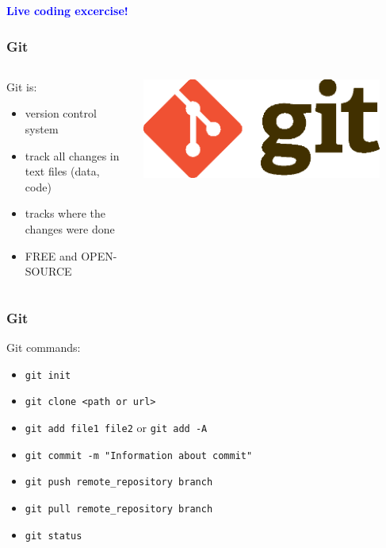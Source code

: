 \documentclass[xcolor=dvipsnames,xcolor=table, 14p]{beamer}
\newcommand{\code}[1]{\colorbox{codegray}{\texttt{#1}}}
\begin{document}
\begin{frame}{}
    \begin{center}
        \textcolor{blue}{\LARGE \bf Live coding excercise!}
    \end{center}
\end{frame}


\begin{frame}\frametitle{Git}
\begin{columns}
    \begin{column}{0.45\textwidth}
        Git is:
        \begin{itemize}
            \item version control system
            \item track all changes in text files (data, code)
            \item tracks where the changes were done
            \item FREE and OPEN-SOURCE
        \end{itemize}
    \end{column}
    \begin{column}{0.45\textwidth}
        \centering
        \includegraphics[width=0.9\textwidth]{../assets/git_logo.eps}
    \end{column}
\end{columns}
\end{frame}

\begin{frame}\frametitle{Git}
Git commands:
\begin{itemize}
    \item \code{git init}
    \item \code{git clone <path or url>}
    \item \code{git add file1 file2} or \code{git add -A}
    \item \code{git commit -m "Information about commit"}
    \item \code{git push remote\_repository branch}
    \item \code{git pull remote\_repository branch}
    \item \code{git status}
\end{itemize}
\end{frame}
\end{document}
